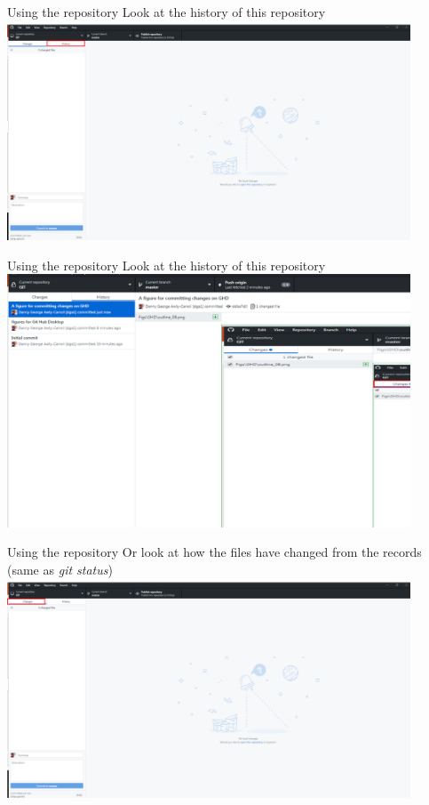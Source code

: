 \documentclass[10pt]{beamer}
\begin{document}
{\begin{frame}[fragile]{Using the repository}
\small Look at the history of this repository
\includegraphics[width=12cm]{Figs/GHD/outline_06}
\end{frame}

\begin{frame}[fragile]{Using the repository}
\small Look at the history of this repository
\includegraphics[width=12cm]{Figs/GHD/hist_00}
\end{frame}


\begin{frame}[fragile]{Using the repository}
\small Or look at how the files have changed from the records (same as \textit{git status})
\includegraphics[width=12cm]{Figs/GHD/outline_07}
\end{frame}


}
\end{document}
